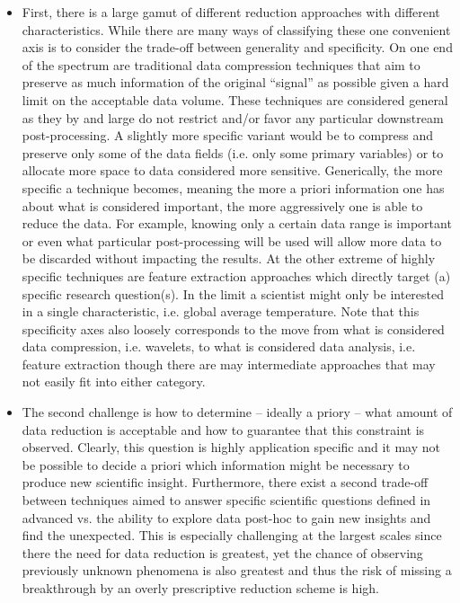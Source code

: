 \begin{itemize}
\item
First, there is a large gamut of different reduction approaches with different characteristics. While there are many ways of classifying these one convenient axis is to consider the trade-off between generality and specificity. On one end of the spectrum are traditional data compression techniques that aim to preserve as much information of the original “signal” as possible given a hard limit on the acceptable data volume. These techniques are considered general as they by and large do not restrict and/or favor any particular downstream post-processing. A slightly more specific variant would be to compress and preserve only some of the data fields (i.e. only some primary variables) or to allocate more space to data considered more sensitive. Generically, the more specific a technique becomes, meaning the more a priori information one has about what is considered important, the more aggressively one is able to reduce the data. For example, knowing only a certain data range is important or even what particular post-processing will be used will allow more data to be discarded without impacting the results. At the other extreme of highly specific techniques are feature extraction approaches which directly target (a) specific research question(s). In the limit a scientist might only be interested in a single characteristic, i.e. global average temperature. Note that this specificity axes also loosely corresponds to the move from what is considered data compression, i.e. wavelets, to what is considered data analysis, i.e. feature extraction though there are may intermediate approaches that may not easily fit into either category.

\item
The second challenge is how to determine -- ideally a priory -- what amount of data reduction is acceptable and how to guarantee that this constraint is observed. Clearly, this question is highly application specific and it may not be possible to decide a priori which information might be necessary to produce new scientific insight. Furthermore, there exist a second trade-off between techniques aimed to answer specific scientific questions defined in advanced vs. the ability to explore data post-hoc to gain new insights and find the unexpected. This is especially challenging at the largest scales since there the need for data reduction is greatest, yet the chance of observing previously unknown phenomena is also greatest and thus the risk of missing a breakthrough by an overly prescriptive reduction scheme is high. 


\end{itemize}
